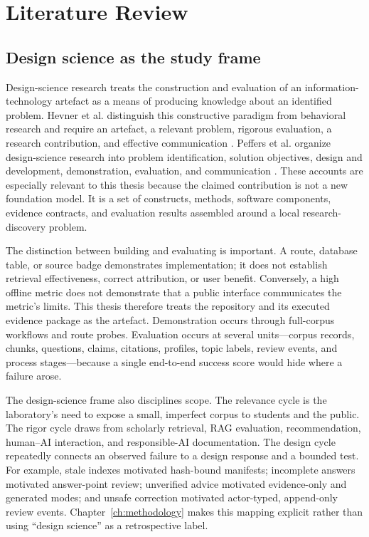 \chapter{Literature Review}
\label{ch:literature}

\section{Design science as the study frame}

Design-science research treats the construction and evaluation of an information-technology artefact as a means of producing knowledge about an identified problem. Hevner et al. distinguish this constructive paradigm from behavioral research and require an artefact, a relevant problem, rigorous evaluation, a research contribution, and effective communication \cite{hevner2004designscience}. Peffers et al. organize design-science research into problem identification, solution objectives, design and development, demonstration, evaluation, and communication \cite{peffers2007dsrm}. These accounts are especially relevant to this thesis because the claimed contribution is not a new foundation model. It is a set of constructs, methods, software components, evidence contracts, and evaluation results assembled around a local research-discovery problem.

The distinction between building and evaluating is important. A route, database table, or source badge demonstrates implementation; it does not establish retrieval effectiveness, correct attribution, or user benefit. Conversely, a high offline metric does not demonstrate that a public interface communicates the metric's limits. This thesis therefore treats the repository and its executed evidence package as the artefact. Demonstration occurs through full-corpus workflows and route probes. Evaluation occurs at several units---corpus records, chunks, questions, claims, citations, profiles, topic labels, review events, and process stages---because a single end-to-end success score would hide where a failure arose.

The design-science frame also disciplines scope. The relevance cycle is the laboratory's need to expose a small, imperfect corpus to students and the public. The rigor cycle draws from scholarly retrieval, RAG evaluation, recommendation, human--AI interaction, and responsible-AI documentation. The design cycle repeatedly connects an observed failure to a design response and a bounded test. For example, stale indexes motivated hash-bound manifests; incomplete answers motivated answer-point review; unverified advice motivated evidence-only and generated modes; and unsafe correction motivated actor-typed, append-only review events. Chapter~\ref{ch:methodology} makes this mapping explicit rather than using ``design science'' as a retrospective label.

